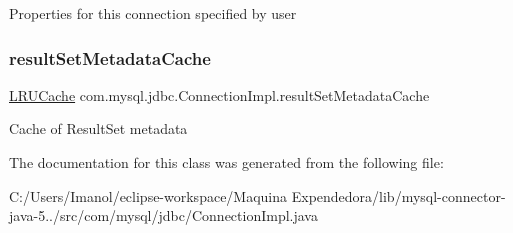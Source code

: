 Properties for this connection specified by user \mbox{\label{classcom_1_1mysql_1_1jdbc_1_1_connection_impl_a1b101ff651d579ed0ce9d196ba76ad9f}} 
\subsubsection{\texorpdfstring{result\+Set\+Metadata\+Cache}{resultSetMetadataCache}}
{\footnotesize\ttfamily \mbox{\hyperlink{classcom_1_1mysql_1_1jdbc_1_1util_1_1_l_r_u_cache}{L\+R\+U\+Cache}} com.\+mysql.\+jdbc.\+Connection\+Impl.\+result\+Set\+Metadata\+Cache\hspace{0.3cm}{\ttfamily [protected]}}

Cache of Result\+Set metadata 

The documentation for this class was generated from the following file\+:\begin{DoxyCompactItemize}
\item 
C\+:/\+Users/\+Imanol/eclipse-\/workspace/\+Maquina Expendedora/lib/mysql-\/connector-\/java-\/5../src/com/mysql/jdbc/Connection\+Impl.\+java\end{DoxyCompactItemize}
